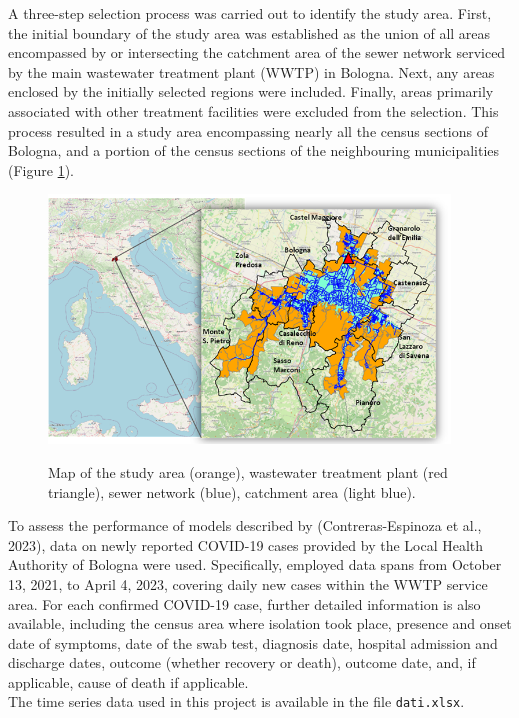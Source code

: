 A three-step selection process was carried out to identify the study area. First, the initial boundary of the study area was established as the union of all areas encompassed by or intersecting the catchment area of the sewer network serviced by the main wastewater treatment plant (WWTP) in Bologna. Next, any areas enclosed by the initially selected regions were included. Finally, areas primarily associated with other treatment facilities were excluded from the selection. This process resulted in a study area encompassing nearly all the census sections of Bologna, and a portion of the census sections of the neighbouring municipalities (Figure \ref{fig:area}). \\

\begin{figure}[b!]
\centering
\caption{Map of the study area (orange), wastewater treatment plant (red triangle), sewer network (blue), catchment area (light blue).}
\includegraphics[width=0.95\textwidth]{area_paper.png}
\label{fig:area}
\end{figure}

To assess the performance of models described by (Contreras-Espinoza et al., 2023), data on newly reported COVID-19 cases provided by the Local Health Authority of Bologna were used. Specifically, employed data spans from October 13, 2021, to April 4, 2023, covering daily new cases within the WWTP service area. For each confirmed COVID-19 case, further detailed information is also available, including the census area where isolation took place, presence and onset date of symptoms, date of the swab test, diagnosis date, hospital admission and discharge dates, outcome (whether recovery or death), outcome date, and, if applicable, cause of death if applicable. \\

The time series data used in this project is available in the file \texttt{dati.xlsx}.